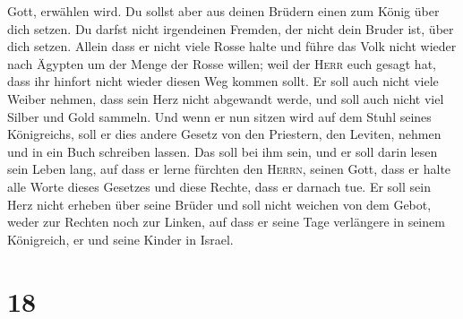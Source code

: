 Gott, erwählen wird. Du sollst aber aus deinen Brüdern einen zum König
über dich setzen. Du darfst nicht irgendeinen Fremden, der nicht dein
Bruder ist, über dich setzen.  Allein dass er nicht viele
Rosse halte und führe das Volk nicht wieder nach Ägypten um der Menge
der Rosse willen; weil der \textsc{Herr} euch gesagt hat, dass ihr
hinfort nicht wieder diesen Weg kommen sollt.  Er soll
auch nicht viele Weiber nehmen, dass sein Herz nicht abgewandt werde,
und soll auch nicht viel Silber und Gold sammeln.  Und
wenn er nun sitzen wird auf dem Stuhl seines Königreichs, soll er dies
andere Gesetz von den Priestern, den Leviten, nehmen und in ein Buch
schreiben lassen.  Das soll bei ihm sein, und er soll
darin lesen sein Leben lang, auf dass er lerne fürchten den
\textsc{Herrn}, seinen Gott, dass er halte alle Worte dieses Gesetzes
und diese Rechte, dass er darnach tue.  Er soll sein Herz
nicht erheben über seine Brüder und soll nicht weichen von dem Gebot,
weder zur Rechten noch zur Linken, auf dass er seine Tage verlängere in
seinem Königreich, er und seine Kinder in Israel.

\hypertarget{section-17}{%
\section{18}\label{section-17}}

